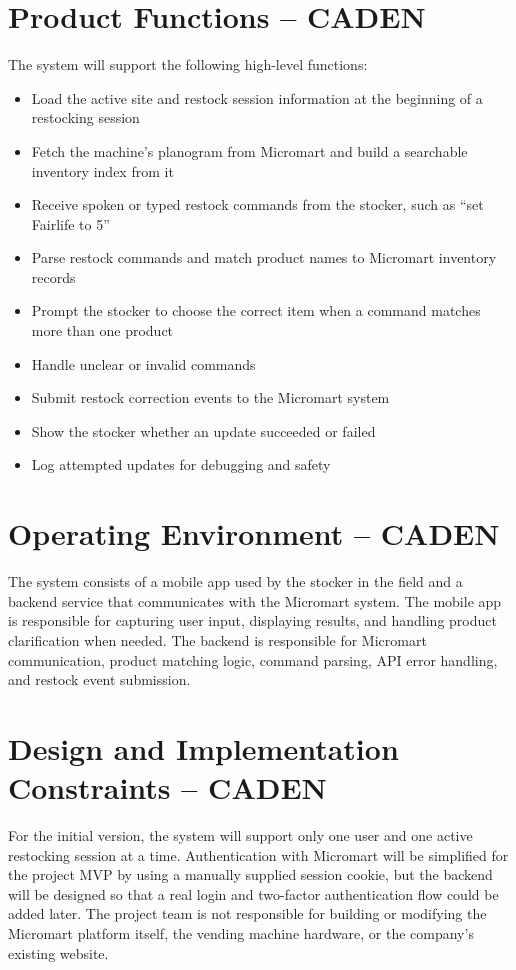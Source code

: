 \documentclass{scrreprt}
\begin{document}
\section{Product Functions -- CADEN}
The system will support the following high-level functions:
\begin{itemize}
    \item Load the active site and restock session information at the beginning of a restocking session
    \item Fetch the machine's planogram from Micromart and build a searchable inventory index from it
    \item Receive spoken or typed restock commands from the stocker, such as ``set Fairlife to 5''
    \item Parse restock commands and match product names to Micromart inventory records
    \item Prompt the stocker to choose the correct item when a command matches more than one product
    \item Handle unclear or invalid commands
    \item Submit restock correction events to the Micromart system
    \item Show the stocker whether an update succeeded or failed
    \item Log attempted updates for debugging and safety
\end{itemize}

\section{Operating Environment -- CADEN}
The system consists of a mobile app used by the stocker in the field and a backend service that communicates with the Micromart system. The mobile app is responsible for capturing user input, displaying results, and handling product clarification when needed. The backend is responsible for Micromart communication, product matching logic, command parsing, API error handling, and restock event submission.

\section{Design and Implementation Constraints -- CADEN}
For the initial version, the system will support only one user and one active restocking session at a time. Authentication with Micromart will be simplified for the project MVP by using a manually supplied session cookie, but the backend will be designed so that a real login and two-factor authentication flow could be added later. The project team is not responsible for building or modifying the Micromart platform itself, the vending machine hardware, or the company's existing website.
\end{document}
